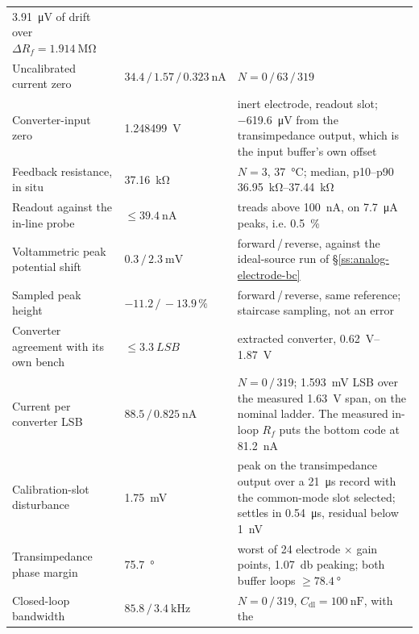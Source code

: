 \begin{table}[!htb]
{\begin{tabular}{@{}%
    >{\raggedright\arraybackslash}p{}%
    >{\raggedleft\arraybackslash}p{}%
    >{\raggedright\arraybackslash}p{}@{}}
      \SI{3.91}{\micro\volt} of drift over \(\Delta R_f = \SI{1.914}{\mega\ohm}\) \\
    Uncalibrated current zero &
      \(34.4\,/\,1.57\,/\,\SI{0.323}{\nano\ampere}\) &
      \(N = 0\,/\,63\,/\,319\) \\
    Converter-input zero &
      \SI{1.248499}{\volt} &
      inert electrode, readout slot; \SI{-619.6}{\micro\volt} from the
      transimpedance output, which is the input buffer's own offset \\
    \addlinespace
    Feedback resistance, in situ &
      \SI{37.16}{\kilo\ohm} &
      \(N = 3\), \SI{37}{\celsius}; median, p10--p90
      \SIrange{36.95}{37.44}{\kilo\ohm} \\
    Readout against the in-line probe &
      \(\le \SI{39.4}{\nano\ampere}\) &
      331 treads above \SI{100}{\nano\ampere}, on \SI{7.7}{\micro\ampere}
      peaks, i.e. \SI{0.5}{\percent} \\
    Voltammetric peak potential shift &
      \(0.3\,/\,\SI{2.3}{\milli\volt}\) &
      forward\,/\,reverse, against the ideal-source run of
      \S\ref{ss:analog-electrode-bc} \\
    Sampled peak height &
      \(-11.2\,/\,{-}13.9\,\%\) &
      forward\,/\,reverse, same reference; staircase sampling, not an error \\
    \addlinespace
    Converter agreement with its own bench &
      \(\le \SI{3.3}{LSB}\) &
      extracted converter, \SIrange{0.62}{1.87}{\volt} \\
    Current per converter LSB &
      \(88.5\,/\,\SI{0.825}{\nano\ampere}\) &
      \(N = 0\,/\,319\); \SI{1.593}{\milli\volt} LSB over the measured
      \SI{1.63}{\volt} span, on the nominal ladder. The measured in-loop
      \(R_f\) puts the bottom code at \SI{81.2}{\nano\ampere} \\
    Calibration-slot disturbance &
      \SI{1.75}{\milli\volt} &
      peak on the transimpedance output over a \SI{21}{\micro\second} record
      with the common-mode slot selected; settles in
      \SI{0.54}{\micro\second}, residual below \SI{1}{\nano\volt} \\
    \addlinespace
    Transimpedance phase margin &
      \SI{75.7}{\degree} &
      worst of 24 electrode\(\,\times\,\)gain points, \SI{1.07}{\decibel}
      peaking; both buffer loops \(\ge \SI{78.4}{\degree}\) \\
    Closed-loop bandwidth &
      \(85.8\,/\,\SI{3.4}{\kilo\hertz}\) &
      \(N = 0\,/\,319\), \(C_{\mathrm{dl}} = \SI{100}{\nano\farad}\), with the

\end{tabular}}
\end{table}
